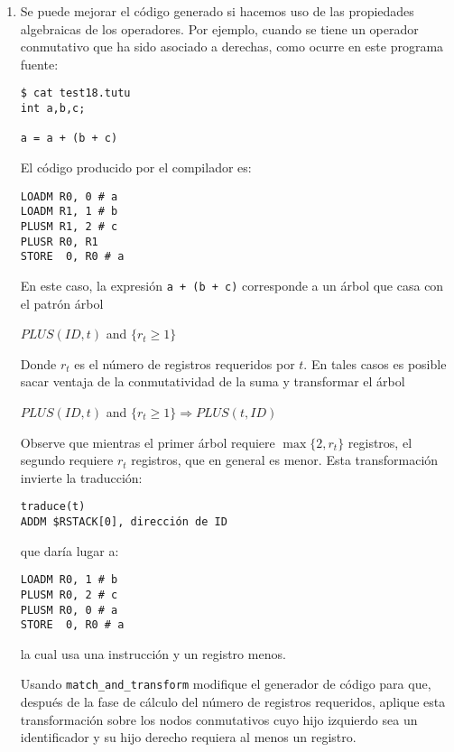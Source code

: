 \begin{enumerate}
\item
Se puede mejorar el código generado
si hacemos uso de las propiedades algebraicas de los 
operadores.
Por ejemplo, cuando se tiene un operador conmutativo que ha sido asociado 
a derechas, como ocurre en este programa fuente:
\begin{verbatim}
$ cat test18.tutu
int a,b,c;

a = a + (b + c)
\end{verbatim}

El código producido por el compilador es:

\begin{verbatim}
LOADM R0, 0 # a
LOADM R1, 1 # b
PLUSM R1, 2 # c
PLUSR R0, R1
STORE  0, R0 # a
\end{verbatim}

En este caso, la expresión \verb|a + (b + c)|  corresponde a un árbol 
que casa con el patrón árbol

\begin{center}
$PLUS(ID, t)$ and $\{ r_t \ge 1 \}$
\end{center}

Donde $r_t$ es el número de registros requeridos por $t$.
En tales casos es posible sacar ventaja
de la conmutatividad de la suma y transformar el
árbol

\begin{center}
$PLUS(ID, t)$ and $\{ r_t \ge 1 \} \Longrightarrow PLUS(t, ID)$
\end{center}

Observe que mientras el primer árbol requiere $\max \{2, r_t \}$
registros, el segundo requiere $r_t$ registros, que en general es menor.
Esta transformación invierte la traducción:

\begin{verbatim}
traduce(t)
ADDM $RSTACK[0], dirección de ID 
\end{verbatim}

que daría lugar a:

\begin{verbatim}
LOADM R0, 1 # b
PLUSM R0, 2 # c
PLUSM R0, 0 # a
STORE  0, R0 # a
\end{verbatim}

la cual usa una instrucción y un registro menos.

Usando \verb|match_and_transform| modifique el generador 
de código para que, después de la fase de cálculo del número
de registros requeridos, aplique esta 
transformación sobre los nodos conmutativos cuyo hijo izquierdo
sea un identificador y su hijo derecho requiera al menos un registro.
\end{enumerate}

